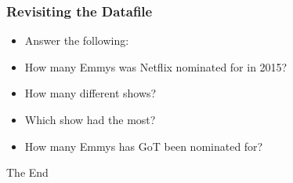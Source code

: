 \documentclass[14pt]{beamer}
\begin{document}
\begin{frame}
\frametitle{Revisiting the Datafile}
\begin{itemize}
	\Large
	\item[] Answer the following:
	\normalsize
	\item[] How many Emmys was Netflix nominated for in 2015? %
	\item[] How many different shows? %
	\item[] Which show had the most? %
	\item[] How many Emmys has GoT been nominated for? %
\end{itemize}
\end{frame}


\begin{frame}
\Huge{\centerline{The End}}
\end{frame}

\end{document}
